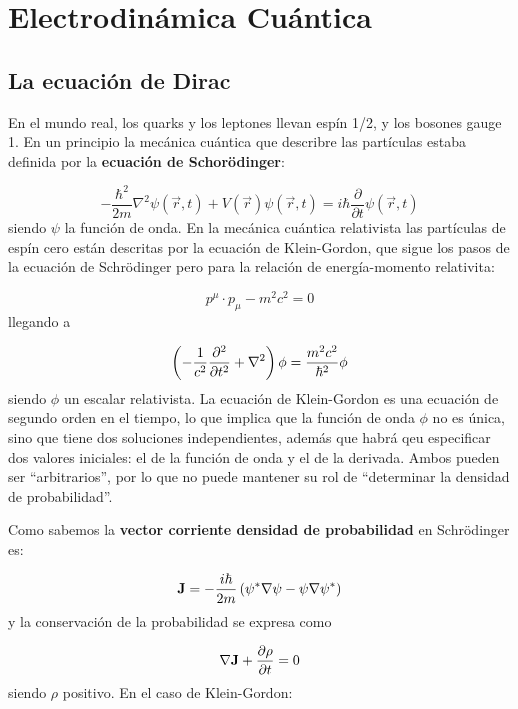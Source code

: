 \chapter{Electrodinámica Cuántica}

\section{La ecuación de Dirac}

En el mundo real, los quarks y los leptones llevan espín 1/2, y los bosones gauge 1. En un principio la mecánica cuántica que describre las partículas estaba definida por la \textbf{ecuación de Schorödinger}:

\begin{equation}
    - \frac{\hbar^2}{2 m} \nabla^2 \psi(\vec{r},t) + V(\vec{r}) \psi(\vec{r},t) = i \hbar \frac{\partial}{\partial t} \psi(\vec{r},t)
\end{equation}
siendo $\psi$ la función de onda. En la mecánica cuántica relativista las partículas de espín cero están descritas por la ecuación de Klein-Gordon, que sigue los pasos de la ecuación de Schrödinger pero para la relación de energía-momento relativita:


\begin{equation*}
    p^\mu \cdot p_\mu - m^2 c^2 = 0
\end{equation*}
llegando a 

\begin{equation*}
    \left( -\frac{1}{c^2} \frac{\partial ^2}{\partial t^2} + \nabla^2 \right) \phi = \frac{m^2 c^2}{\hbar^2} \phi
\end{equation*}
siendo $\phi$ un escalar relativista. La ecuación de Klein-Gordon es una ecuación de segundo orden en el tiempo, lo que implica que la función de onda $\phi$ no es única, sino que tiene dos soluciones independientes, además que habrá qeu especificar dos valores iniciales: el de la función de onda y el de la derivada. Ambos pueden ser ``arbitrarios'', por lo que no puede mantener su rol de ``determinar la densidad de probabilidad''. 

Como sabemos la \textbf{vector corriente densidad de probabilidad} en Schrödinger es:

\begin{equation*}
    \mathbf{J} = - \frac{i\hbar}{2m} \left( \psi^* \nabla \psi - \psi \nabla \psi^* \right)
\end{equation*}
y la conservación de la probabilidad se expresa como 

\begin{equation*}
    \nabla \mathbf{J} + \frac{\partial \rho}{\partial t} = 0
\end{equation*}
siendo $\rho$ positivo. En el caso de Klein-Gordon: 



